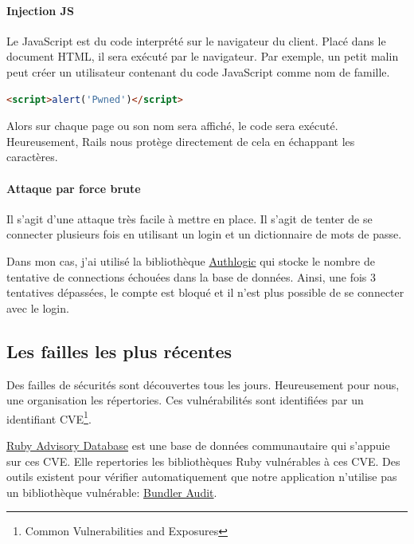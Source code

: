 \documentclass[]{report}
\begin{document}
      \paragraph{Injection JS}

        Le JavaScript est du code interprété sur le navigateur du client. Placé dans le document HTML, il sera exécuté par le navigateur. Par exemple, un petit malin peut créer un utilisateur contenant du code JavaScript comme nom de famille.

        \begin{scriptsize}
          \begin{lstlisting}[language=html, caption={Un exemple d'injection SQL}]
          <script>alert('Pwned')</script>
          \end{lstlisting}
        \end{scriptsize}

        Alors sur chaque page ou son nom sera affiché, le code sera exécuté. Heureusement, Rails nous protège directement de cela en échappant les caractères.

      \paragraph{Attaque par force brute}

        Il s'agit d'une attaque très facile à mettre en place. Il s'agit de tenter de se connecter plusieurs fois en utilisant un login et un dictionnaire de mots de passe.

        Dans mon cas, j'ai utilisé la bibliothèque \href{https://github.com/binarylogic/authlogic}{Authlogic} qui stocke le nombre de tentative de connections échouées dans la base de données. Ainsi, une fois 3 tentatives dépassées, le compte est bloqué et il n'est plus possible de se connecter avec le login.

    \subsection{Les failles les plus récentes}

      Des failles de sécurités sont découvertes tous les jours. Heureusement pour nous, une organisation les répertories. Ces vulnérabilités sont identifiées par un identifiant CVE\footnote{Common Vulnerabilities and Exposures}.

      \href{https://github.com/rubysec/ruby-advisory-db}{Ruby Advisory Database} est une base de données communautaire qui s'appuie sur ces CVE. Elle repertories les bibliothèques Ruby vulnérables à ces CVE. Des outils existent pour vérifier automatiquement que notre application n'utilise pas un bibliothèque vulnérable: \href{https://github.com/rubysec/bundler-audit}{Bundler Audit}.
\end{document}
